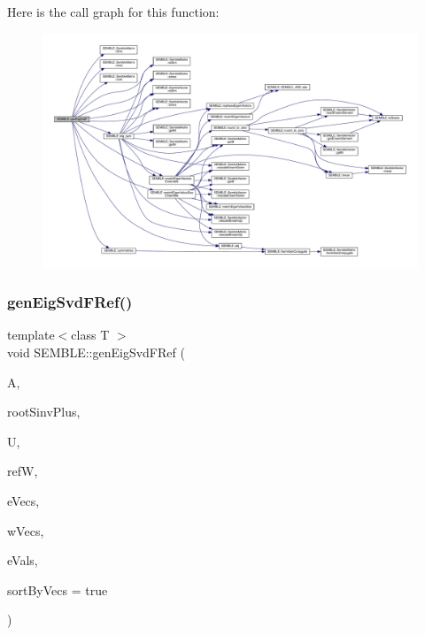 Here is the call graph for this function\+:
\nopagebreak
\begin{figure}[H]
\begin{center}
\leavevmode
\includegraphics[width=350pt]{d7/dfd/namespaceSEMBLE_a4aaeea64468bfb9ed46e42fd7d0eaa24_cgraph}
\end{center}
\end{figure}
\mbox{\label{namespaceSEMBLE_ac189f06361cccd1177aff4ded44c28fb}} 
\subsubsection{\texorpdfstring{genEigSvdFRef()}{genEigSvdFRef()}\hspace{0.1cm}{\footnotesize\ttfamily [1/2]}}
{\footnotesize\ttfamily template$<$class T $>$ \\
void S\+E\+M\+B\+L\+E\+::gen\+Eig\+Svd\+F\+Ref (\begin{DoxyParamCaption}\item[{const \mbox{\hyperlink{structSEMBLE_1_1SembleMatrix}{Semble\+Matrix}}$<$ T $>$ \&}]{A,  }\item[{const \mbox{\hyperlink{structSEMBLE_1_1SembleMatrix}{Semble\+Matrix}}$<$ double $>$ \&}]{root\+Sinv\+Plus,  }\item[{const \mbox{\hyperlink{structSEMBLE_1_1SembleMatrix}{Semble\+Matrix}}$<$ T $>$ \&}]{U,  }\item[{const \mbox{\hyperlink{structSEMBLE_1_1SembleMatrix}{Semble\+Matrix}}$<$ T $>$ \&}]{refW,  }\item[{\mbox{\hyperlink{structSEMBLE_1_1SembleMatrix}{Semble\+Matrix}}$<$ T $>$ \&}]{e\+Vecs,  }\item[{\mbox{\hyperlink{structSEMBLE_1_1SembleMatrix}{Semble\+Matrix}}$<$ T $>$ \&}]{w\+Vecs,  }\item[{\mbox{\hyperlink{structSEMBLE_1_1SembleVector}{Semble\+Vector}}$<$ double $>$ \&}]{e\+Vals,  }\item[{const bool}]{sort\+By\+Vecs = {\ttfamily true} }\end{DoxyParamCaption})}

